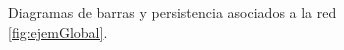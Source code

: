 \documentclass[12pt, a4paper, twoside]{book}
\numberwithin{equation}{section}
\theoremstyle{definition}
\newenvironment{ejem}
  {\pushQED{\qed}\renewcommand{\qedsymbol}{$\blacktriangleleft$}\ejemplo}
  {\popQED\endejemplo}
\theoremstyle{remark}
\theoremstyle{plain}
\begin{document}
\begin{ejem}
	\begin{figure}[!htbp]
			\begin{figure}[H]
			\end{figure}
		\endminipage
			\begin{figure}[H]
			\end{figure}
		\endminipage
		\caption{Diagramas de barras y persistencia asociados a la red 
		\ref{fig:ejemGlobal}.}
		\label{fig:ejemLocalDiag}
	\end{figure}
	

\end{ejem}
\end{document}

